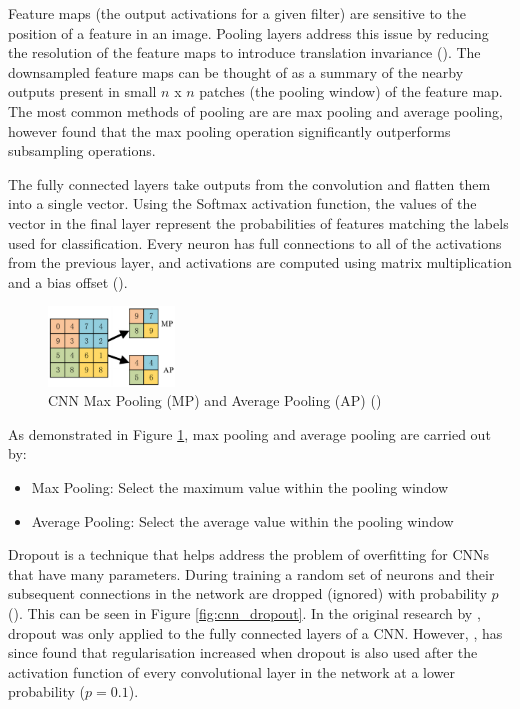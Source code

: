 Feature maps (the output activations for a given filter) are sensitive to the position of a feature in an image. Pooling layers address this issue by reducing the resolution of the feature maps to introduce translation invariance (\cite{scherer_evaluation_2010}). The downsampled feature maps can be thought of as a summary of the nearby outputs present in small $n$ x $n$ patches (the pooling window) of the feature map. The most common methods of pooling are are max pooling and average pooling, however \cite{scherer_evaluation_2010} found that the max pooling operation significantly outperforms subsampling operations.

The fully connected layers take outputs from the convolution and flatten them into a single vector. Using the Softmax activation function, the values of the vector in the final layer represent the probabilities of features matching the labels used for classification. Every neuron has full connections to all of the activations from the previous layer, and activations are computed using matrix multiplication and a bias offset (\cite{stanford_cs231n_2019}).

\begin{figure}[ht!]
\centering
\includegraphics[width=0.30\textwidth]{media/literature/machine_learning/ml_pooling.png}
\caption[Diagram of CNN Max Pooling and Average Pooling ]{\acrshort{CNN} Max Pooling (MP) and Average Pooling (AP) (\cite{wang_pooling_2018})}
\label{fig:cnn_pooling}
\end{figure}

As demonstrated in Figure \ref{fig:cnn_pooling}, max pooling and average pooling are carried out by:

\begin{itemize}
    \item Max Pooling: Select the maximum value within the pooling window
    \item Average Pooling: Select the average value within the pooling window
\end{itemize}

Dropout is a technique that helps address the problem of overfitting for \acrshort{CNN}s that have many parameters. During training a random set of neurons and their subsequent connections in the network are dropped (ignored) with probability $p$ (\cite{srivastava_dropout_2014}). This can be seen in Figure \ref{fig:cnn_dropout}. In the original research by \cite{hinton_dropout_2012}, dropout was only applied to the fully connected layers of a \acrshort{CNN}. However, \cite{lai_dropout_2017}, has since found that regularisation increased when dropout is also used after the activation function of every convolutional layer in the network at a lower probability ($p = 0.1$).

